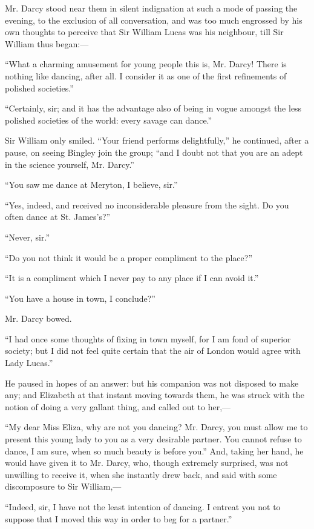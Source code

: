 \documentclass[12pt]{book}
\begin{document}
Mr. Darcy stood near them in silent indignation at such a mode of passing the evening, to the exclusion of all conversation, and was too much engrossed by his own thoughts to perceive that Sir William Lucas was his neighbour, till Sir William thus began:---

``What a charming amusement for young people this is, Mr. Darcy! There is nothing like dancing, after all. I consider it as one of the first refinements of polished societies.''

``Certainly, sir; and it has the advantage also of being in vogue amongst the less polished societies of the world: every savage can dance.''

Sir William only smiled. ``Your friend performs delightfully,'' he continued, after a pause, on seeing Bingley join the group; ``and I doubt not that you are an adept in the science yourself, Mr. Darcy.''

``You saw me dance at Meryton, I believe, sir.''

``Yes, indeed, and received no inconsiderable pleasure from the sight. Do you often dance at St. James's?''

``Never, sir.''

``Do you not think it would be a proper compliment to the place?''

``It is a compliment which I never pay to any place if I can avoid it.''

``You have a house in town, I conclude?''

Mr. Darcy bowed.

``I had once some thoughts of fixing in town myself, for I am fond of superior society; but I did not feel quite certain that the air of London would agree with Lady Lucas.''

He paused in hopes of an answer: but his companion was not disposed to make any; and Elizabeth at that instant moving towards them, he was struck with the notion of doing a very gallant thing, and called out to her,---

``My dear Miss Eliza, why are not you dancing? Mr. Darcy, you must allow me to present this young lady to you as a very desirable partner. You cannot refuse to dance, I am sure, when so much beauty is before you.'' And, taking her hand, he would have given it to Mr. Darcy, who, though extremely surprised, was not unwilling to receive it, when she instantly drew back, and said with some discomposure to Sir William,---

``Indeed, sir, I have not the least intention of dancing. I entreat you not to suppose that I moved this way in order to beg for a partner.''
\end{document}
